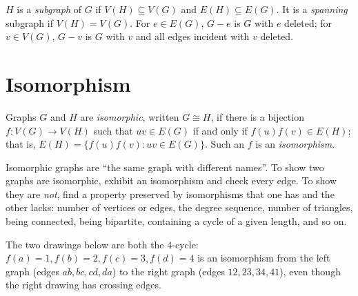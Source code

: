 \begin{definition}[Subgraph]
$H$ is a \emph{subgraph} of $G$ if $V(H) \subseteq V(G)$ and $E(H) \subseteq E(G)$. It is a
\emph{spanning} subgraph if $V(H) = V(G)$. For $e \in E(G)$, $G - e$ is $G$ with $e$ deleted; for
$v \in V(G)$, $G - v$ is $G$ with $v$ and all edges incident with $v$ deleted.
\end{definition}

\section{Isomorphism}

\begin{definition}[Isomorphism]
Graphs $G$ and $H$ are \emph{isomorphic}, written $G \cong H$, if there is a bijection
$f : V(G) \to V(H)$ such that $uv \in E(G)$ if and only if $f(u)f(v) \in E(H)$; that is,
$E(H) = \{f(u)f(v) : uv \in E(G)\}$. Such an $f$ is an \emph{isomorphism}.
\end{definition}

Isomorphic graphs are ``the same graph with different names''. To show two graphs are
isomorphic, exhibit an isomorphism and check every edge. To show they are \emph{not}, find a
property preserved by isomorphisms that one has and the other lacks: number of vertices or
edges, the degree sequence, number of triangles, being connected, being bipartite, containing a
cycle of a given length, and so on.

\begin{example}
The two drawings below are both the $4$-cycle: $f(a)=1, f(b)=2, f(c)=3, f(d)=4$ is an
isomorphism from the left graph (edges $ab, bc, cd, da$) to the right graph (edges
$12, 23, 34, 41$), even though the right drawing has crossing edges.
\begin{center}
\end{center}
\end{example}

